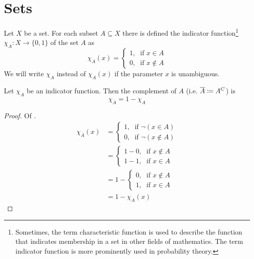\section{Sets}\label{sec-sets}


\begin{definition}\label{def-indicator-function}
    Let $X$ be a set. For each subset $A \subseteq X$ there is defined the 
    indicator function\footnote{Sometimes, the term characteristic function is 
    used to describe the function that indicates membership in a set in other 
    fields of mathematics. The term indicator function is more prominently used 
    in probability theory.} $\chi_A:X\rightarrow \{0,1\}$ of the set $A$ as
    \begin{equation}
        \chi_A(x) = \begin{cases}
            1,\;\text{ if } x \in A \\
            0,\;\text{ if } x \notin A
        \end{cases}
    \end{equation}
    We will write $\chi_A$ instead of $\chi_A(x)$ if the parameter
    $x$ is unambiguous.
\end{definition}

\begin{thm}\label{thm-complement-indicator-function}
    Let $\chi_A$ be an indicator function. Then the complement of $A$ (i.e. 
    $\overline{A} \coloneqq A^C$) is
    \begin{equation*}
        \chi_{\overline{A}} = 1 - \chi_A
    \end{equation*}
\end{thm}

\begin{proof}
    Of .
    \begin{align*}
        \chi_{\overline{A}}(x) &= \begin{cases}
            1,\;\text{ if } \neg(x \in A) \\
            0,\;\text{ if } \neg(x \notin A)
        \end{cases} \\
        &= \begin{cases}
            1-0,\;\text{ if } x \notin A \\
            1-1,\;\text{ if } x \in A
        \end{cases} \\
        &=1 - \begin{cases}
            0,\;\text{ if } x \notin A \\
            1,\;\text{ if } x \in A
        \end{cases} \\
        &= 1 - \chi_A(x)
    \end{align*}
\end{proof}

